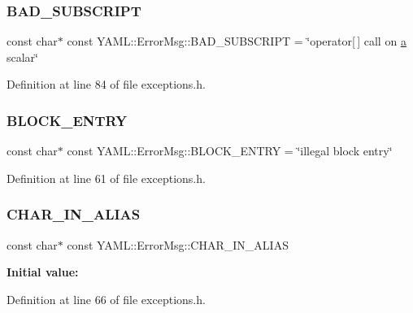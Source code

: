 \subsubsection{\texorpdfstring{BAD\_SUBSCRIPT}{BAD\_SUBSCRIPT}}
{\footnotesize\ttfamily const char$\ast$ const Y\+A\+M\+L\+::\+Error\+Msg\+::\+B\+A\+D\+\_\+\+S\+U\+B\+S\+C\+R\+I\+PT = \char`\"{}operator\mbox{[}$\,$\mbox{]} call on \mbox{\hyperlink{glad_8h_ac8729153468b5dcf13f971b21d84d4e5}{a}} scalar\char`\"{}}



Definition at line 84 of file exceptions.\+h.

\mbox{\label{namespace_y_a_m_l_1_1_error_msg_afe3775f0ffe2627b2d584107815c47e3}} 
\subsubsection{\texorpdfstring{BLOCK\_ENTRY}{BLOCK\_ENTRY}}
{\footnotesize\ttfamily const char$\ast$ const Y\+A\+M\+L\+::\+Error\+Msg\+::\+B\+L\+O\+C\+K\+\_\+\+E\+N\+T\+RY = \char`\"{}illegal block entry\char`\"{}}



Definition at line 61 of file exceptions.\+h.

\mbox{\label{namespace_y_a_m_l_1_1_error_msg_ab4b6c0de1afaf2752685ca275f5a02c8}} 
\subsubsection{\texorpdfstring{CHAR\_IN\_ALIAS}{CHAR\_IN\_ALIAS}}
{\footnotesize\ttfamily const char$\ast$ const Y\+A\+M\+L\+::\+Error\+Msg\+::\+C\+H\+A\+R\+\_\+\+I\+N\+\_\+\+A\+L\+I\+AS}

{\bfseries Initial value\+:}
\begin{DoxyCode}{0}
\DoxyCodeLine{=}
\DoxyCodeLine{    \textcolor{stringliteral}{"illegal character found while scanning alias"}}

\end{DoxyCode}


Definition at line 66 of file exceptions.\+h.


